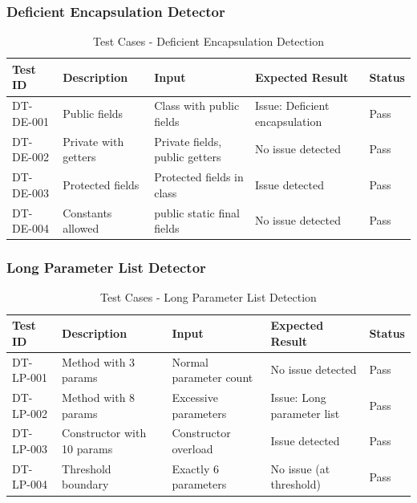 \documentclass[12pt,a4paper]{article}
\begin{document}
    \subsubsection{Deficient Encapsulation Detector}

    \begin{table}[H]
        \caption{Test Cases - Deficient Encapsulation Detection}
        \begin{tabular}{|p{2cm}|p{4cm}|p{3cm}|p{3cm}|p{1.5cm}|}
            \hline
            \textbf{Test ID} & \textbf{Description} & \textbf{Input} & \textbf{Expected Result} & \textbf{Status} \\
            \hline
            DT-DE-001 & Public fields & Class with public fields & Issue: Deficient encapsulation & Pass \\
            \hline
            DT-DE-002 & Private with getters & Private fields, public getters & No issue detected & Pass \\
            \hline
            DT-DE-003 & Protected fields & Protected fields in class & Issue detected & Pass \\
            \hline
            DT-DE-004 & Constants allowed & public static final fields & No issue detected & Pass \\
            \hline
        \end{tabular}
    \end{table}

    \subsubsection{Long Parameter List Detector}

    \begin{table}[H]
        \caption{Test Cases - Long Parameter List Detection}
        \begin{tabular}{|p{2cm}|p{4cm}|p{3cm}|p{3cm}|p{1.5cm}|}
            \hline
            \textbf{Test ID} & \textbf{Description} & \textbf{Input} & \textbf{Expected Result} & \textbf{Status} \\
            \hline
            DT-LP-001 & Method with 3 params & Normal parameter count & No issue detected & Pass \\
            \hline
            DT-LP-002 & Method with 8 params & Excessive parameters & Issue: Long parameter list & Pass \\
            \hline
            DT-LP-003 & Constructor with 10 params & Constructor overload & Issue detected & Pass \\
            \hline
            DT-LP-004 & Threshold boundary & Exactly 6 parameters & No issue (at threshold) & Pass \\
            \hline
        \end{tabular}
    \end{table}
\end{document}
